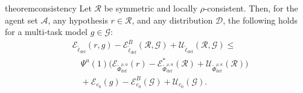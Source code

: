 \begin{restatable}{theorem}{consistency}
\label{theo:consistency}
Let \( \mathcal{R} \) be symmetric and locally \( \rho \)-consistent. Then, for the agent set \( \mathcal{A} \), any hypothesis \( r \in \mathcal{R} \), and any distribution \( \mathcal{D} \), the following holds for a multi-task model \( g \in \mathcal{G} \):
\begin{equation*}
    \begin{aligned}
        & \mathcal{E}_{\widetilde{\ell}_{\text{def}}}(r, g) - \mathcal{E}_{\widetilde{\ell}_{\text{def}}}^B(\mathcal{R}, \mathcal{G}) + \mathcal{U}_{\widetilde{\ell}_{\text{def}}}(\mathcal{R}, \mathcal{G}) \leq \\
        & \quad \Psi^u(1) \Big( \mathcal{E}_{\widetilde{\Phi}^{\rho, u}_{\text{def}}}(r) - \mathcal{E}_{\widetilde{\Phi}^{\rho, u}_{\text{def}}}^\ast(\mathcal{R}) + \mathcal{U}_{\widetilde{\Phi}^{\rho, u}_{\text{def}}}(\mathcal{R}) \Big) \\
        & \quad + \mathcal{E}_{c_0}(g) - \mathcal{E}_{c_0}^B(\mathcal{G}) + \mathcal{U}_{c_0}(\mathcal{G}).
    \end{aligned}
\end{equation*}
\end{restatable}

